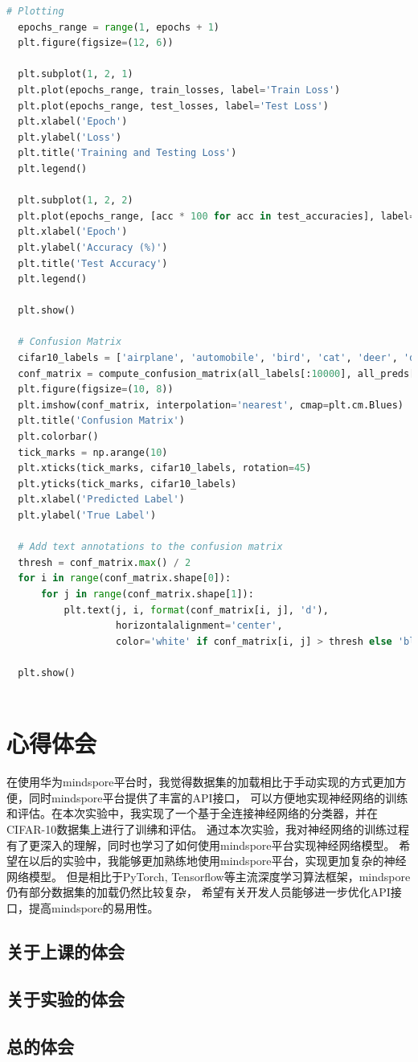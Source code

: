 \documentclass[12pt]{article}
\begin{document}
\begin{lstlisting}[language=Python]
  # Plotting
  epochs_range = range(1, epochs + 1)
  plt.figure(figsize=(12, 6))
  
  plt.subplot(1, 2, 1)
  plt.plot(epochs_range, train_losses, label='Train Loss')
  plt.plot(epochs_range, test_losses, label='Test Loss')
  plt.xlabel('Epoch')
  plt.ylabel('Loss')
  plt.title('Training and Testing Loss')
  plt.legend()
  
  plt.subplot(1, 2, 2)
  plt.plot(epochs_range, [acc * 100 for acc in test_accuracies], label='Test Accuracy')
  plt.xlabel('Epoch')
  plt.ylabel('Accuracy (%)')
  plt.title('Test Accuracy')
  plt.legend()
  
  plt.show()
  
  # Confusion Matrix
  cifar10_labels = ['airplane', 'automobile', 'bird', 'cat', 'deer', 'dog', 'frog', 'horse', 'ship', 'truck']
  conf_matrix = compute_confusion_matrix(all_labels[:10000], all_preds[:10000], 10)
  plt.figure(figsize=(10, 8))
  plt.imshow(conf_matrix, interpolation='nearest', cmap=plt.cm.Blues)
  plt.title('Confusion Matrix')
  plt.colorbar()
  tick_marks = np.arange(10)
  plt.xticks(tick_marks, cifar10_labels, rotation=45)
  plt.yticks(tick_marks, cifar10_labels)
  plt.xlabel('Predicted Label')
  plt.ylabel('True Label')
  
  # Add text annotations to the confusion matrix
  thresh = conf_matrix.max() / 2
  for i in range(conf_matrix.shape[0]):
      for j in range(conf_matrix.shape[1]):
          plt.text(j, i, format(conf_matrix[i, j], 'd'),
                   horizontalalignment='center',
                   color='white' if conf_matrix[i, j] > thresh else 'black')
  
  plt.show()
  
\end{lstlisting}

\newpage
\section{\centering 心得体会}
在使用华为mindspore平台时，我觉得数据集的加载相比于手动实现的方式更加方便，同时mindspore平台提供了丰富的API接口，
可以方便地实现神经网络的训练和评估。在本次实验中，我实现了一个基于全连接神经网络的分类器，并在CIFAR-10数据集上进行了训绋和评估。
通过本次实验，我对神经网络的训练过程有了更深入的理解，同时也学习了如何使用mindspore平台实现神经网络模型。
希望在以后的实验中，我能够更加熟练地使用mindspore平台，实现更加复杂的神经网络模型。
但是相比于PyTorch, Tensorflow等主流深度学习算法框架，mindspore仍有部分数据集的加载仍然比较复杂，
希望有关开发人员能够进一步优化API接口，提高mindspore的易用性。

\subsection{关于上课的体会}

\subsection{关于实验的体会}

\subsection{总的体会}
\end{document}
